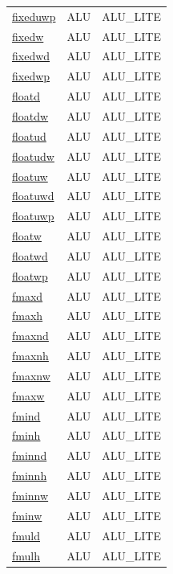 \begin{small}
\begin{longtable}[l]{l l l}
\hyperlink{lvx.fixeduwp}{fixeduwp} & ALU & ALU\_LITE \\ 
\hyperlink{lvx.fixedw}{fixedw} & ALU & ALU\_LITE \\ 
\hyperlink{lvx.fixedwd}{fixedwd} & ALU & ALU\_LITE \\ 
\hyperlink{lvx.fixedwp}{fixedwp} & ALU & ALU\_LITE \\ 
\hyperlink{lvx.floatd}{floatd} & ALU & ALU\_LITE \\ 
\hyperlink{lvx.floatdw}{floatdw} & ALU & ALU\_LITE \\ 
\hyperlink{lvx.floatud}{floatud} & ALU & ALU\_LITE \\ 
\hyperlink{lvx.floatudw}{floatudw} & ALU & ALU\_LITE \\ 
\hyperlink{lvx.floatuw}{floatuw} & ALU & ALU\_LITE \\ 
\hyperlink{lvx.floatuwd}{floatuwd} & ALU & ALU\_LITE \\ 
\hyperlink{lvx.floatuwp}{floatuwp} & ALU & ALU\_LITE \\ 
\hyperlink{lvx.floatw}{floatw} & ALU & ALU\_LITE \\ 
\hyperlink{lvx.floatwd}{floatwd} & ALU & ALU\_LITE \\ 
\hyperlink{lvx.floatwp}{floatwp} & ALU & ALU\_LITE \\ 
\hyperlink{lvx.fmaxd}{fmaxd} & ALU & ALU\_LITE \\ 
\hyperlink{lvx.fmaxh}{fmaxh} & ALU & ALU\_LITE \\ 
\hyperlink{lvx.fmaxnd}{fmaxnd} & ALU & ALU\_LITE \\ 
\hyperlink{lvx.fmaxnh}{fmaxnh} & ALU & ALU\_LITE \\ 
\hyperlink{lvx.fmaxnw}{fmaxnw} & ALU & ALU\_LITE \\ 
\hyperlink{lvx.fmaxw}{fmaxw} & ALU & ALU\_LITE \\ 
\hyperlink{lvx.fmind}{fmind} & ALU & ALU\_LITE \\ 
\hyperlink{lvx.fminh}{fminh} & ALU & ALU\_LITE \\ 
\hyperlink{lvx.fminnd}{fminnd} & ALU & ALU\_LITE \\ 
\hyperlink{lvx.fminnh}{fminnh} & ALU & ALU\_LITE \\ 
\hyperlink{lvx.fminnw}{fminnw} & ALU & ALU\_LITE \\ 
\hyperlink{lvx.fminw}{fminw} & ALU & ALU\_LITE \\ 
\hyperlink{lvx.fmuld}{fmuld} & ALU & ALU\_LITE \\ 
\hyperlink{lvx.fmulh}{fmulh} & ALU & ALU\_LITE \\ 

\end{longtable}
\end{small}
